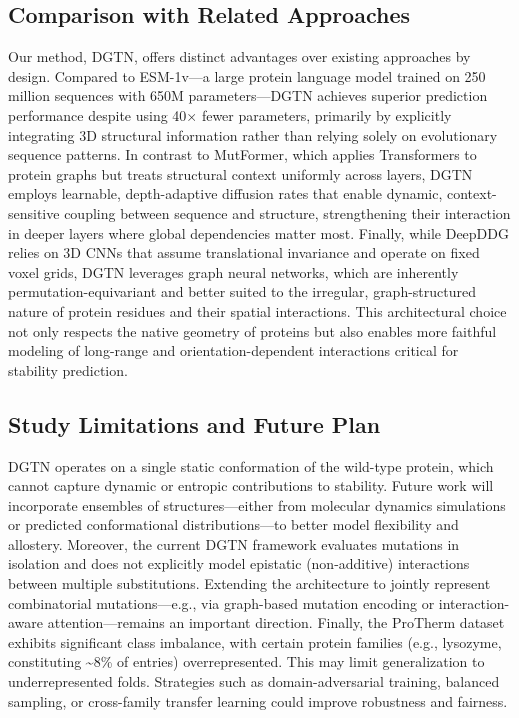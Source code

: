\documentclass[11pt]{article}
\begin{document}
\subsection*{Comparison with Related Approaches}

Our method, DGTN, offers distinct advantages over existing approaches by
design. Compared to ESM-1v—a large protein language model trained on 250
million sequences with 650M parameters—DGTN achieves superior prediction
performance despite using 40× fewer parameters, primarily by explicitly
integrating 3D structural information rather than relying solely on
evolutionary sequence patterns. In contrast to MutFormer, which applies
Transformers to protein graphs but treats structural context uniformly across
layers, DGTN employs learnable, depth-adaptive diffusion rates that enable
dynamic, context-sensitive coupling between sequence and structure,
strengthening their interaction in deeper layers where global dependencies
matter most. Finally, while DeepDDG relies on 3D CNNs that assume translational
invariance and operate on fixed voxel grids, DGTN leverages graph neural
networks, which are inherently permutation-equivariant and better suited to the
irregular, graph-structured nature of protein residues and their spatial
interactions. This architectural choice not only respects the native geometry
of proteins but also enables more faithful modeling of long-range and
orientation-dependent interactions critical for stability prediction.

\subsection*{Study Limitations and Future Plan}


DGTN operates on a single static conformation of the wild-type protein,
which cannot capture dynamic or entropic contributions to stability. Future
work will incorporate ensembles of structures—either from molecular dynamics
simulations or predicted conformational distributions—to better model
flexibility and allostery.
Moreover, 
the current DGTN framework evaluates mutations in isolation and does not explicitly
model epistatic (non-additive) interactions between multiple substitutions.
Extending the architecture to jointly represent combinatorial mutations—e.g.,
via graph-based mutation encoding or interaction-aware attention—remains an
important direction.
Finally, the ProTherm dataset exhibits significant class imbalance, with certain protein
families (e.g., lysozyme, constituting \textasciitilde8\% of entries)
overrepresented. This may limit generalization to underrepresented folds.
Strategies such as domain-adversarial training, balanced sampling, or
cross-family transfer learning could improve robustness and fairness.
\end{document}

